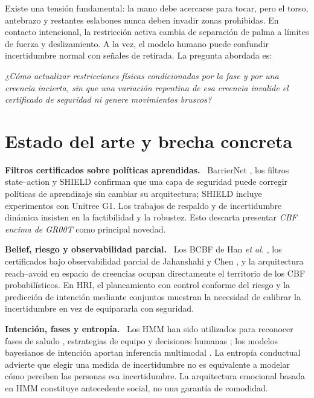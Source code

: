 \documentclass[10pt,a4paper,twocolumn]{article}
\newcommand{\subttl}[1]{\vspace{3pt}\noindent\textbf{\color{ink}#1.}~}
\begin{document}
Existe una tensión fundamental: la mano debe acercarse para tocar, pero el torso, antebrazo y restantes eslabones nunca deben invadir zonas prohibidas. En contacto intencional, la restricción activa cambia de separación de palma a límites de fuerza y deslizamiento. A la vez, el modelo humano puede confundir incertidumbre normal con señales de retirada. La pregunta abordada es:
\begin{tcolorbox}[colback=papergray,colframe=accent,boxrule=.7pt,left=5pt,right=5pt,top=5pt,bottom=5pt]
\emph{¿Cómo actualizar restricciones físicas condicionadas por la fase y por una creencia incierta, sin que una variación repentina de esa creencia invalide el certificado de seguridad ni genere movimientos bruscos?}
\end{tcolorbox}

\section{Estado del arte y brecha concreta}
\subttl{Filtros certificados sobre políticas aprendidas} BarrierNet \cite{r7}, los filtros state--action \cite{r8} y SHIELD \cite{r1} confirman que una capa de seguridad puede corregir políticas de aprendizaje sin cambiar su arquitectura; SHIELD incluye experimentos con Unitree G1. Los trabajos de respaldo y de incertidumbre dinámica \cite{r9,r11,r12} insisten en la factibilidad y la robustez. Esto descarta presentar \emph{CBF encima de GR00T} como principal novedad.

\subttl{Belief, riesgo y observabilidad parcial} Los BCBF de Han \emph{et al.} \cite{r2}, los certificados bajo observabilidad parcial de Jahanshahi y Chen \cite{r3}, y la arquitectura reach--avoid en espacio de creencias \cite{r4} ocupan directamente el territorio de los CBF probabilísticos. En HRI, el planeamiento con control conforme del riesgo \cite{r5} y la predicción de intención mediante conjuntos \cite{r18} muestran la necesidad de calibrar la incertidumbre en vez de equipararla con seguridad.

\subttl{Intención, fases y entropía} Los HMM han sido utilizados para reconocer fases de saludo \cite{r14}, estrategias de equipo \cite{r15} y decisiones humanas \cite{r16}; los modelos bayesianos de intención aportan inferencia multimodal \cite{r17,r19}. La entropía conductual \cite{r20} advierte que elegir una medida de incertidumbre no es equivalente a modelar cómo perciben las personas esa incertidumbre. La arquitectura emocional basada en HMM \cite{r30} constituye antecedente social, no una garantía de comodidad.
\end{document}
